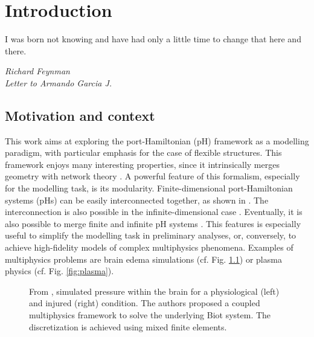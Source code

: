 \chapter[Introduction]{Introduction}

\epigraph{I was born not knowing and have had only a little time to change that here and there.}
{\textit{Richard Feynman \\ Letter to Armando Garcia J.}}


\minitoc

\section{Motivation and context}

This work aims at exploring the port-Hamiltonian (pH) framework as a modelling paradigm, with particular emphasis for the case of flexible structures. This framework enjoys many interesting properties, since it intrinsically merges geometry with network theory \cite{vanderschaft2006book}. A powerful feature of this formalism, especially for the modelling task, is its modularity. Finite-dimensional port-Hamiltonian systems (pHs) can be easily interconnected together, as shown in \cite{cervera2007interconnection}. The interconnection is also possible in the infinite-dimensional case \cite{kurula2010}. Eventually, it is also possible to merge finite and infinite pH systems \cite{pasumarthy2006}. This features is especially useful to simplify the modelling task in preliminary analyses, or, conversely, to achieve high-fidelity models of complex multiphysics phenomena. Examples of multiphysics problems are brain edema simulations \cite{ju2020brain} (cf. Fig. \ref{fig:p_brain}) or plasma physics \cite{nattila2019runko} (cf. Fig. \ref{fig:plasma}). \\





\begin{figure}[htbp]%
	\centering
	\hspace{8pt}%
	\caption[]{From \cite{ju2020brain}, simulated pressure within the brain for a physiological (left) and injured (right) condition. The authors proposed a coupled multiphysics framework to solve the underlying Biot system. The discretization is achieved using mixed finite elements.}%
	\label{fig:p_brain}%
\end{figure}

